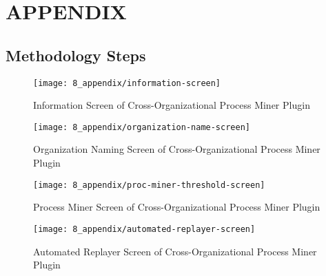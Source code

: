 \chapter{APPENDIX}

\section{Methodology Steps}
\label{sec:appendix-methodology-steps}
\begin{figure}[ht]
	\centering
	\texttt{[image: 8\_appendix/information-screen]}
	\caption{Information Screen of Cross-Organizational Process Miner Plugin}
	\label{fig:information-screen}
\end{figure}
\begin{figure}[ht]
	\centering
	\texttt{[image: 8\_appendix/organization-name-screen]}
	\caption{Organization Naming Screen of Cross-Organizational Process Miner Plugin}
  \label{fig:organization-name-screen}
\end{figure}

\begin{figure}[ht]
	\centering
	\texttt{[image: 8\_appendix/proc-miner-threshold-screen]}
	\caption{Process Miner Screen of Cross-Organizational Process Miner Plugin}
  \label{fig:proc-miner-threshold-screen}
\end{figure}

\begin{figure}[ht]
	\centering
	\texttt{[image: 8\_appendix/automated-replayer-screen]}
	\caption{Automated Replayer Screen of Cross-Organizational Process Miner Plugin}
  \label{fig:automated-replayer-screen}
\end{figure}

